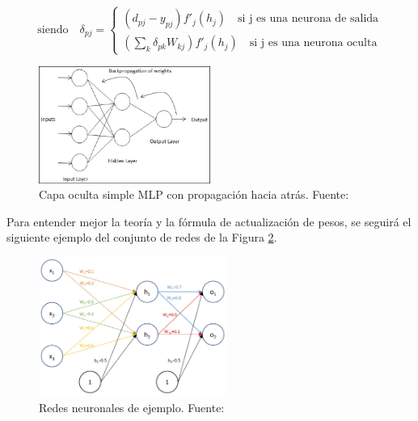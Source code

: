 \begin{itemize}
\begin{itemize}
\begin{itemize}
			\begin{equation}
			\text{siendo} \quad \delta_{pj} =
			\left\{
			\begin{aligned}
				(d_{pj}-y_{pj})f'_j(h_j) \quad\text{si j es una neurona de salida}\\
				\left(\sum_{k} \delta_{pk} W_{kj}\right)f'_j(h_j) \quad\text{si j es una neurona oculta}
			\end{aligned}
			\right.
			\end{equation}
			
			\begin{figure}[h]
				\begin{center}
					\includegraphics[width=0.5\textwidth]{2/figures/backpropagation.jpg}
					\caption[Capa oculta simple MLP con propagación hacia atrás]{Capa oculta simple MLP con propagación hacia atrás. Fuente: \cite{gl_iartificial2019descentgrad}}
					\label{2:fig15}
				\end{center}
			\end{figure}
			
			Para entender mejor la teoría y la fórmula de actualización de pesos, se seguirá el siguiente ejemplo del conjunto de redes de la Figura \ref{2:fig16}.
			
			\clearpage
			\begin{figure}[h]
				\begin{center}
					\includegraphics[width=0.55\textwidth]{2/figures/rna_pesos.jpg}
					\caption[Redes neuronales de ejemplo]{Redes neuronales de ejemplo. Fuente: \cite{gl_ansrw2019backpropagation}}
					\label{2:fig16}
				\end{center}
			\end{figure}
			

\end{itemize}
\end{itemize}
\end{itemize}
